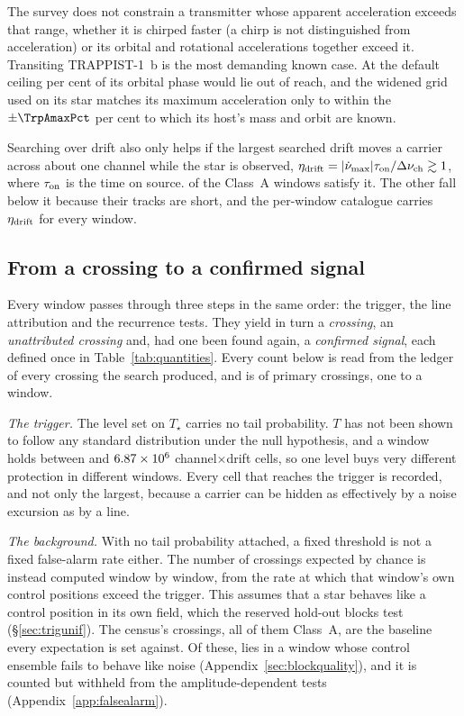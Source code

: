 The survey does not constrain a transmitter whose apparent
acceleration exceeds that range, whether it is chirped faster (a chirp is
not distinguished from acceleration) or its orbital and
rotational accelerations together exceed it. Transiting TRAPPIST-1~b is the
most demanding known case. At the default ceiling \TrapPhaseHi{} per cent of
its orbital phase would lie out of reach, and the widened grid used on its
star matches its maximum acceleration only to within the $\pm\TrpAmaxPct$ per
cent to which its host's mass and orbit are known.

Searching over drift also only helps if the largest searched drift moves a
carrier across about one channel while the star is observed,
$\eta_{\rm drift}=|\dot\nu_{\max}|\tau_{\rm on}/\Delta\nu_{\rm ch}\gtrsim1$,
where $\tau_{\rm on}$ is the time on source. \EtaDriftAOk{} of the \NWinA{}
Class~A windows satisfy it. The other \EtaDriftALo{} fall below it because
their tracks are short, and the per-window catalogue carries
$\eta_{\rm drift}$ for every window.

\subsection{From a crossing to a confirmed signal}
\label{sec:summary}

Every window passes through three steps in the same order: the trigger, the
line attribution and the recurrence tests. They yield in turn a
\emph{crossing}, an \emph{unattributed crossing} and, had one been found
again, a \emph{confirmed signal}, each defined once in Table~\ref{tab:quantities}.
Every count below is read from the ledger of every crossing the search
produced, and is of primary crossings, one to a window.

\emph{The trigger.} The level set on $T_\star$ carries no tail probability.
$T$ has not been shown to follow any standard distribution under the null
hypothesis, and a window holds between \TuCellsLo{} and $6.87 \times 10^{6}$
channel$\times$drift cells, so one level buys very different protection in
different windows. Every cell that reaches the trigger is recorded, and not
only the largest, because a carrier can be hidden as effectively by a noise
excursion as by a line.

\emph{The background.} With no tail probability attached, a fixed threshold
is not a fixed false-alarm rate either. The number of crossings expected by chance is instead computed window
by window, from the rate at which that window's own control positions exceed
the trigger. This assumes that a star behaves like a control position in its
own field, which the reserved hold-out blocks test (\S\ref{sec:trigunif}).
The census's \CsNCrossQp{} crossings, all of them Class~A, are the baseline
every expectation is set against. Of these, \BkFlagNCrossOther{} lies in a
window whose control ensemble fails to behave like noise
(Appendix~\ref{sec:blockquality}), and it is counted but withheld from the
amplitude-dependent tests (Appendix~\ref{app:falsealarm}).

